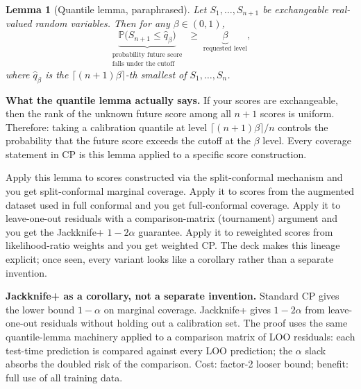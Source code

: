 \documentclass[letterpaper,11pt,leqno]{article}
\newtheorem*{lemstar}{Lemma}
\begin{document}
\begin{lemstar}[Quantile lemma, paraphrased]
Let $S_1, \dots, S_{n+1}$ be exchangeable real-valued random variables. Then for any $\beta \in (0, 1)$,
\begin{equation*}
\underbrace{\mathbb{P}\bigl(S_{n+1} \leq \hat{q}_{\beta}\bigr)}_{\substack{\text{probability future score}\\\text{falls under the cutoff}}}
\;\geq\;
\underbrace{\beta}_{\text{requested level}},
\end{equation*}
where $\hat{q}_{\beta}$ is the $\lceil(n+1)\beta\rceil$-th smallest of $S_1, \dots, S_n$.
\end{lemstar}

\begin{definitionexplain}
\textbf{What the quantile lemma actually says.} If your scores are exchangeable, then the rank of the unknown future score among all $n+1$ scores is uniform. Therefore: taking a calibration quantile at level $\lceil(n+1)\beta\rceil/n$ controls the probability that the future score exceeds the cutoff at the $\beta$ level. Every coverage statement in CP is this lemma applied to a specific score construction.
\end{definitionexplain}

Apply this lemma to scores constructed via the split-conformal mechanism and you get split-conformal marginal coverage. Apply it to scores from the augmented dataset used in full conformal and you get full-conformal coverage. Apply it to leave-one-out residuals with a comparison-matrix (tournament) argument and you get the Jackknife+ $1 - 2\alpha$ guarantee. Apply it to reweighted scores from likelihood-ratio weights and you get weighted CP. The deck makes this lineage explicit; once seen, every variant looks like a corollary rather than a separate invention.

\begin{theoremexplain}
\textbf{Jackknife+ as a corollary, not a separate invention.} Standard CP gives the lower bound $1 - \alpha$ on marginal coverage. Jackknife+ gives $1 - 2\alpha$ from leave-one-out residuals without holding out a calibration set. The proof uses the same quantile-lemma machinery applied to a comparison matrix of LOO residuals: each test-time prediction is compared against every LOO prediction; the $\alpha$ slack absorbs the doubled risk of the comparison. Cost: factor-2 looser bound; benefit: full use of all training data.
\end{theoremexplain}
\end{document}
